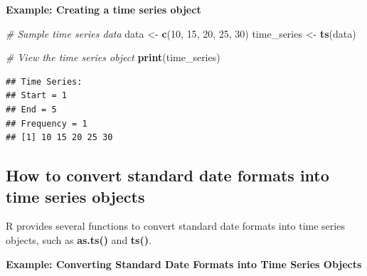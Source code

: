 \documentclass[
]{book}
\newenvironment{Shaded}{\begin{snugshade}}{\end{snugshade}}
\newcommand{\AttributeTok}[1]{\textcolor[rgb]{0.13,0.29,0.53}{#1}}
\newcommand{\CommentTok}[1]{\textcolor[rgb]{0.56,0.35,0.01}{\textit{#1}}}
\newcommand{\DecValTok}[1]{\textcolor[rgb]{0.00,0.00,0.81}{#1}}
\newcommand{\FunctionTok}[1]{\textcolor[rgb]{0.13,0.29,0.53}{\textbf{#1}}}
\newcommand{\NormalTok}[1]{#1}
\newcommand{\OtherTok}[1]{\textcolor[rgb]{0.56,0.35,0.01}{#1}}
\newcommand{\SpecialCharTok}[1]{\textcolor[rgb]{0.81,0.36,0.00}{\textbf{#1}}}
\newcommand{\StringTok}[1]{\textcolor[rgb]{0.31,0.60,0.02}{#1}}
\begin{document}
\textbf{Example: Creating a time series object}

\begin{Shaded}
\begin{Highlighting}[]
\CommentTok{\# Sample time series data}
\NormalTok{data }\OtherTok{\textless{}{-}} \FunctionTok{c}\NormalTok{(}\DecValTok{10}\NormalTok{, }\DecValTok{15}\NormalTok{, }\DecValTok{20}\NormalTok{, }\DecValTok{25}\NormalTok{, }\DecValTok{30}\NormalTok{)}
\NormalTok{time\_series }\OtherTok{\textless{}{-}} \FunctionTok{ts}\NormalTok{(data)}

\CommentTok{\# View the time series object}
\FunctionTok{print}\NormalTok{(time\_series)}
\end{Highlighting}
\end{Shaded}

\begin{verbatim}
## Time Series:
## Start = 1 
## End = 5 
## Frequency = 1 
## [1] 10 15 20 25 30
\end{verbatim}

\subsection{How to convert standard date formats into time series objects}\label{how-to-convert-standard-date-formats-into-time-series-objects}

R provides several functions to convert standard date formats into time series objects, such as \textbf{as.ts()} and \textbf{ts()}.

\textbf{Example: Converting Standard Date Formats into Time Series Objects}

\begin{Shaded}
\end{Shaded}
\end{document}
